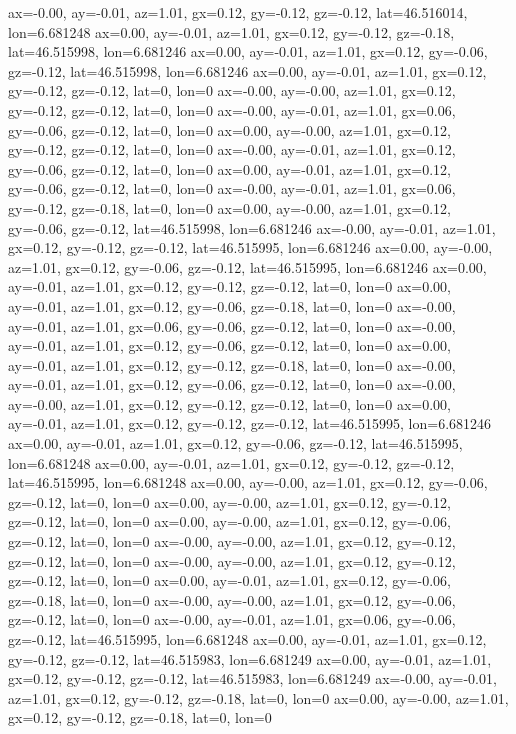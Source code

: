 ax=-0.00, ay=-0.01, az=1.01, gx=0.12, gy=-0.12, gz=-0.12, lat=46.516014, lon=6.681248
ax=0.00, ay=-0.01, az=1.01, gx=0.12, gy=-0.12, gz=-0.18, lat=46.515998, lon=6.681246
ax=0.00, ay=-0.01, az=1.01, gx=0.12, gy=-0.06, gz=-0.12, lat=46.515998, lon=6.681246
ax=0.00, ay=-0.01, az=1.01, gx=0.12, gy=-0.12, gz=-0.12, lat=0, lon=0
ax=-0.00, ay=-0.00, az=1.01, gx=0.12, gy=-0.12, gz=-0.12, lat=0, lon=0
ax=-0.00, ay=-0.01, az=1.01, gx=0.06, gy=-0.06, gz=-0.12, lat=0, lon=0
ax=0.00, ay=-0.00, az=1.01, gx=0.12, gy=-0.12, gz=-0.12, lat=0, lon=0
ax=-0.00, ay=-0.01, az=1.01, gx=0.12, gy=-0.06, gz=-0.12, lat=0, lon=0
ax=0.00, ay=-0.01, az=1.01, gx=0.12, gy=-0.06, gz=-0.12, lat=0, lon=0
ax=-0.00, ay=-0.01, az=1.01, gx=0.06, gy=-0.12, gz=-0.18, lat=0, lon=0
ax=0.00, ay=-0.00, az=1.01, gx=0.12, gy=-0.06, gz=-0.12, lat=46.515998, lon=6.681246
ax=-0.00, ay=-0.01, az=1.01, gx=0.12, gy=-0.12, gz=-0.12, lat=46.515995, lon=6.681246
ax=0.00, ay=-0.00, az=1.01, gx=0.12, gy=-0.06, gz=-0.12, lat=46.515995, lon=6.681246
ax=0.00, ay=-0.01, az=1.01, gx=0.12, gy=-0.12, gz=-0.12, lat=0, lon=0
ax=0.00, ay=-0.01, az=1.01, gx=0.12, gy=-0.06, gz=-0.18, lat=0, lon=0
ax=-0.00, ay=-0.01, az=1.01, gx=0.06, gy=-0.06, gz=-0.12, lat=0, lon=0
ax=-0.00, ay=-0.01, az=1.01, gx=0.12, gy=-0.06, gz=-0.12, lat=0, lon=0
ax=0.00, ay=-0.01, az=1.01, gx=0.12, gy=-0.12, gz=-0.18, lat=0, lon=0
ax=-0.00, ay=-0.01, az=1.01, gx=0.12, gy=-0.06, gz=-0.12, lat=0, lon=0
ax=-0.00, ay=-0.00, az=1.01, gx=0.12, gy=-0.12, gz=-0.12, lat=0, lon=0
ax=0.00, ay=-0.01, az=1.01, gx=0.12, gy=-0.12, gz=-0.12, lat=46.515995, lon=6.681246
ax=0.00, ay=-0.01, az=1.01, gx=0.12, gy=-0.06, gz=-0.12, lat=46.515995, lon=6.681248
ax=0.00, ay=-0.01, az=1.01, gx=0.12, gy=-0.12, gz=-0.12, lat=46.515995, lon=6.681248
ax=0.00, ay=-0.00, az=1.01, gx=0.12, gy=-0.06, gz=-0.12, lat=0, lon=0
ax=0.00, ay=-0.00, az=1.01, gx=0.12, gy=-0.12, gz=-0.12, lat=0, lon=0
ax=0.00, ay=-0.00, az=1.01, gx=0.12, gy=-0.06, gz=-0.12, lat=0, lon=0
ax=-0.00, ay=-0.00, az=1.01, gx=0.12, gy=-0.12, gz=-0.12, lat=0, lon=0
ax=-0.00, ay=-0.00, az=1.01, gx=0.12, gy=-0.12, gz=-0.12, lat=0, lon=0
ax=0.00, ay=-0.01, az=1.01, gx=0.12, gy=-0.06, gz=-0.18, lat=0, lon=0
ax=-0.00, ay=-0.00, az=1.01, gx=0.12, gy=-0.06, gz=-0.12, lat=0, lon=0
ax=-0.00, ay=-0.01, az=1.01, gx=0.06, gy=-0.06, gz=-0.12, lat=46.515995, lon=6.681248
ax=0.00, ay=-0.01, az=1.01, gx=0.12, gy=-0.12, gz=-0.12, lat=46.515983, lon=6.681249
ax=0.00, ay=-0.01, az=1.01, gx=0.12, gy=-0.12, gz=-0.12, lat=46.515983, lon=6.681249
ax=-0.00, ay=-0.01, az=1.01, gx=0.12, gy=-0.12, gz=-0.18, lat=0, lon=0
ax=0.00, ay=-0.00, az=1.01, gx=0.12, gy=-0.12, gz=-0.18, lat=0, lon=0
